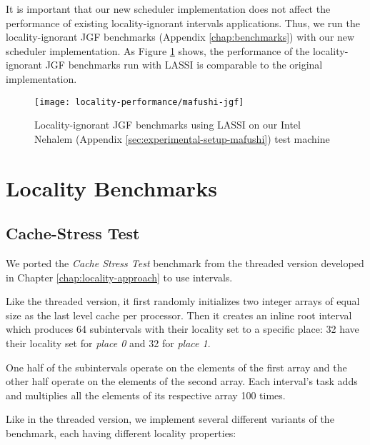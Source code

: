 It is important that our new scheduler implementation does not affect
the performance of existing locality-ignorant intervals
applications. Thus, we run the locality-ignorant JGF benchmarks
(Appendix \ref{chap:benchmarks}) with our new scheduler
implementation. As Figure \ref{fig:locality-performance-jgf} shows,
the performance of the locality-ignorant JGF benchmarks run with LASSI
is comparable to the original implementation.

\begin{figure}[!ht]
  \centering
  \texttt{[image: locality-performance/mafushi-jgf]}
  \caption[Locality-ignorant JGF benchmarks using LASSI on our Intel
  Nehalem test machine]{Locality-ignorant JGF benchmarks using LASSI
    on our Intel Nehalem (Appendix
    \ref{sec:experimental-setup-mafushi}) test machine}
  \label{fig:locality-performance-jgf}
\end{figure}


\section{Locality Benchmarks}
\label{sec:locality-performance-locality}

\subsection{Cache-Stress Test}
\label{sec:locality-performance-cache-stress-test}

We ported the \emph{Cache Stress Test} benchmark from the threaded
version developed in Chapter \ref{chap:locality-approach} to use
intervals.

Like the threaded version, it first randomly initializes two integer
arrays of equal size as the last level cache per processor. Then it
creates an inline root interval which produces 64 subintervals with
their locality set to a specific place: 32 have their locality set for
\emph{place 0} and 32 for \emph{place 1}.

One half of the subintervals operate on the elements of the first
array and the other half operate on the elements of the second
array. Each interval's task adds and multiplies all the elements of
its respective array 100 times.

Like in the threaded version, we implement several different variants
of the benchmark, each having different locality properties:

